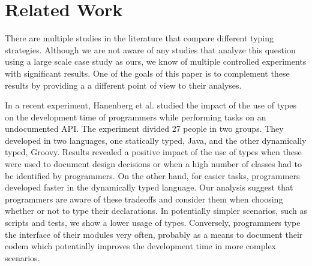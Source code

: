 \documentclass[]{sigplanconf}
\begin{document}
%
%
\section{Related Work\label{related}}
There are multiple studies in the literature that compare different typing strategies.
Although we are not aware of any studies that analyze this question using a large scale case study as ours, we know of multiple controlled experiments with significant results.
One of the goals of this paper is to complement these results by providing a a different point of view to their analyses. 

In a recent experiment, Hanenberg et al. \cite{Hanenberg13} studied the impact of the use of types on the development time of programmers while performing tasks on an undocumented API.
The experiment divided 27 people in two groups.
They developed in two languages, one statically typed, Java, and the other dynamically typed, Groovy.
Results revealed a positive impact of the use of types when these were used to document design decisions or when a high number of classes had to be identified by programmers.
On the other hand, for easier tasks, programmers developed faster in the dynamically typed language.
Our analysis suggest that programmers are aware of these tradeoffs and consider them when choosing whether or not to type their declarations.
In potentially simpler scenarios, such as scripts and tests, we show a lower usage of types.
Conversely, programmers type the interface of their modules very often, probably as a means to document their codem which potentially improves the development time in more complex scenarios.
\end{document}
